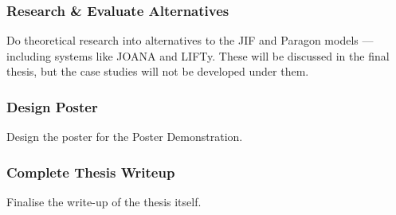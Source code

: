 \subsubsection*{Research \& Evaluate Alternatives}

Do theoretical research into alternatives to the JIF and Paragon models --- including systems like JOANA and LIFTy. These will be discussed in the final thesis, but the case studies will not be developed under them.

\subsubsection*{Design Poster}

Design the poster for the Poster Demonstration.

\subsubsection*{Complete Thesis Writeup}

Finalise the write-up of the thesis itself.